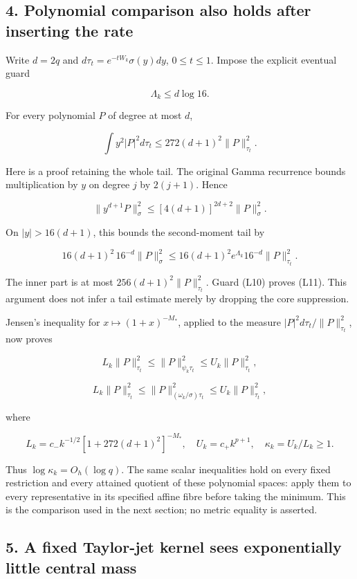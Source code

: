 \subsection{4. Polynomial comparison also holds after inserting the rate}\label{loc:polynomial-comparison-also-holds-after-inserting-the-rate}

Write \(d=2q\) and \(d\tau_t=e^{-tW_k}\sigma(y)dy\), \(0\le t\le1\). Impose the explicit eventual guard

\[
\Lambda_k\le d\log16.
\tag{L10}
\]

For every polynomial \(P\) of degree at most \(d\),

\[
\boxed{\int y^2|P|^2d\tau_t\le272(d+1)^2\|P\|_{\tau_t}^2.}
\tag{L11}
\]

Here is a proof retaining the whole tail. The original Gamma recurrence bounds multiplication by \(y\) on degree \(j\) by \(2(j+1)\). Hence

\[
\|y^{d+1}P\|_\sigma^2\le[4(d+1)]^{2d+2}\|P\|_\sigma^2.
\]

On \(|y|>16(d+1)\), this bounds the second-moment tail by

\[
16(d+1)^2\,16^{-d}\|P\|_\sigma^2
\le16(d+1)^2e^{\Lambda_k}16^{-d}\|P\|_{\tau_t}^2.
\]

The inner part is at most \(256(d+1)^2\|P\|_{\tau_t}^2\). Guard (L10) proves (L11). This argument does not infer a tail estimate merely by dropping the core suppression.

Jensen's inequality for \(x\mapsto(1+x)^{-M_*}\), applied to the measure \(|P|^2d\tau_t/\|P\|_{\tau_t}^2\), now proves

\[
L_k\|P\|_{\tau_t}^2\le\|P\|_{\psi_k\tau_t}^2
\le U_k\|P\|_{\tau_t}^2,
\]

\[
L_k\|P\|_{\tau_t}^2\le\|P\|_{(\omega_k/\sigma)\tau_t}^2
\le U_k\|P\|_{\tau_t}^2,
\tag{L12}
\]

where

\[
L_k=c_-k^{-1/2}[1+272(d+1)^2]^{-M_*},\quad
U_k=c_+k^{p+1},\quad\kappa_k=U_k/L_k\ge1.
\tag{L13}
\]

Thus \(\log\kappa_k=O_h(\log q)\). The same scalar inequalities hold on every fixed restriction and every attained quotient of these polynomial spaces: apply them to every representative in its specified affine fibre before taking the minimum. This is the comparison used in the next section; no metric equality is asserted.

\subsection{5. A fixed Taylor-jet kernel sees exponentially little central mass}\label{loc:a-fixed-taylor-jet-kernel-sees-exponentially-little-central-mass}


